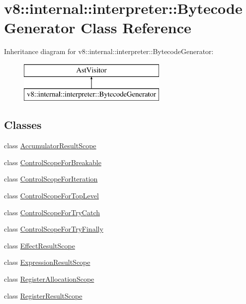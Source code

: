 \hypertarget{classv8_1_1internal_1_1interpreter_1_1_bytecode_generator}{}\section{v8\+:\+:internal\+:\+:interpreter\+:\+:Bytecode\+Generator Class Reference}
\label{classv8_1_1internal_1_1interpreter_1_1_bytecode_generator}
Inheritance diagram for v8\+:\+:internal\+:\+:interpreter\+:\+:Bytecode\+Generator\+:\begin{figure}[H]
\begin{center}
\leavevmode
\includegraphics[height=2.000000cm]{classv8_1_1internal_1_1interpreter_1_1_bytecode_generator}
\end{center}
\end{figure}
\subsection*{Classes}
\begin{DoxyCompactItemize}
\item 
class \hyperlink{classv8_1_1internal_1_1interpreter_1_1_bytecode_generator_1_1_accumulator_result_scope}{Accumulator\+Result\+Scope}
\item 
class \hyperlink{classv8_1_1internal_1_1interpreter_1_1_bytecode_generator_1_1_control_scope_for_breakable}{Control\+Scope\+For\+Breakable}
\item 
class \hyperlink{classv8_1_1internal_1_1interpreter_1_1_bytecode_generator_1_1_control_scope_for_iteration}{Control\+Scope\+For\+Iteration}
\item 
class \hyperlink{classv8_1_1internal_1_1interpreter_1_1_bytecode_generator_1_1_control_scope_for_top_level}{Control\+Scope\+For\+Top\+Level}
\item 
class \hyperlink{classv8_1_1internal_1_1interpreter_1_1_bytecode_generator_1_1_control_scope_for_try_catch}{Control\+Scope\+For\+Try\+Catch}
\item 
class \hyperlink{classv8_1_1internal_1_1interpreter_1_1_bytecode_generator_1_1_control_scope_for_try_finally}{Control\+Scope\+For\+Try\+Finally}
\item 
class \hyperlink{classv8_1_1internal_1_1interpreter_1_1_bytecode_generator_1_1_effect_result_scope}{Effect\+Result\+Scope}
\item 
class \hyperlink{classv8_1_1internal_1_1interpreter_1_1_bytecode_generator_1_1_expression_result_scope}{Expression\+Result\+Scope}
\item 
class \hyperlink{classv8_1_1internal_1_1interpreter_1_1_bytecode_generator_1_1_register_allocation_scope}{Register\+Allocation\+Scope}
\item 
class \hyperlink{classv8_1_1internal_1_1interpreter_1_1_bytecode_generator_1_1_register_result_scope}{Register\+Result\+Scope}
\end{DoxyCompactItemize}

